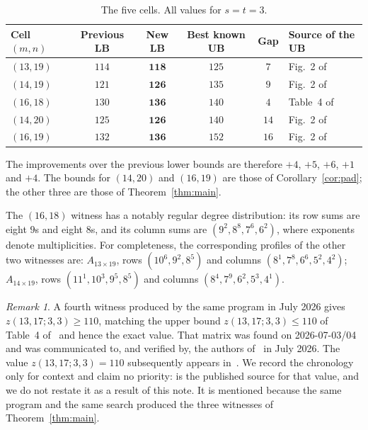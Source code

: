 \documentclass[11pt,reqno]{amsart}
\theoremstyle{plain}
\theoremstyle{remark}
\newtheorem{remark}[theorem]{Remark}
\newcommand{\zz}{z}
\begin{document}
\begin{table}[htbp]
\centering
\caption{The five cells. All values for $s=t=3$.}
\label{tab:results}
\begin{tabular}{lccccl}
\toprule
Cell $(m,n)$ & Previous LB & New LB & Best known UB & Gap & Source of the UB \\
\midrule
$(13,19)$ & $114$ & $\mathbf{118}$ & $125$ & $7$  & Fig.~2 of~\cite{BNL} \\
$(14,19)$ & $121$ & $\mathbf{126}$ & $135$ & $9$  & Fig.~2 of~\cite{BNL} \\
$(16,18)$ & $130$ & $\mathbf{136}$ & $140$ & $4$  & Table~4 of~\cite{CRWR16} \\
$(14,20)$ & $125$ & $\mathbf{126}$ & $140$ & $14$ & Fig.~2 of~\cite{BNL} \\
$(16,19)$ & $132$ & $\mathbf{136}$ & $152$ & $16$ & Fig.~2 of~\cite{BNL} \\
\bottomrule
\end{tabular}
\end{table}

\noindent
The improvements over the previous lower bounds are therefore $+4$, $+5$, $+6$, $+1$ and $+4$.
The bounds for $(14,20)$ and $(16,19)$ are those of Corollary~\ref{cor:pad}; the other three are
those of Theorem~\ref{thm:main}.

The $(16,18)$ witness has a notably regular degree distribution: its row sums are eight $9$s and
eight $8$s, and its column sums are $(9^2,8^8,7^6,6^2)$, where exponents denote multiplicities. For
completeness, the corresponding profiles of the other two witnesses are: $A_{13\times19}$, rows
$(10^6,9^2,8^5)$ and columns $(8^1,7^8,6^6,5^2,4^2)$; $A_{14\times19}$, rows
$(11^1,10^3,9^5,8^5)$ and columns $(8^4,7^9,6^2,5^3,4^1)$.

\begin{remark}\label{rem:1317}
A fourth witness produced by the same program in July 2026 gives $\zz(13,17;3,3)\ge 110$, matching
the upper bound $\zz(13,17;3,3)\le 110$ of Table~4 of~\cite{CRWR16} and hence the exact value. That
matrix was found on 2026-07-03/04 and was communicated to, and verified by, the authors of~\cite{BNL}
in July 2026. The value $\zz(13,17;3,3)=110$ subsequently appears in~\cite{Hou26}. We record the
chronology only for context and claim no priority: \cite{Hou26} is the published source for that
value, and we do not restate it as a result of this note. It is mentioned because the same program
and the same search produced the three witnesses of Theorem~\ref{thm:main}.
\end{remark}
\end{document}
